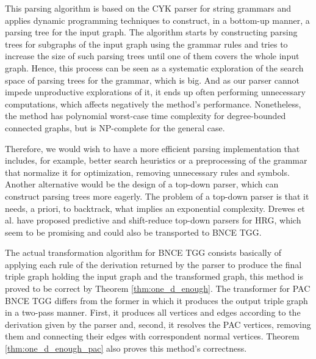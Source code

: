 This parsing algorithm is based on the CYK parser for string grammars and applies dynamic programming techniques to construct, in a bottom-up manner, a parsing tree for the input graph. The algorithm starts by constructing parsing trees for subgraphs of the input graph using the grammar rules and tries to increase the size of such parsing trees until one of them covers the whole input graph. Hence, this process can be seen as a systematic exploration of the search space of parsing trees for the grammar, which is big. And as our parser cannot impede unproductive explorations of it, it ends up often performing unnecessary computations, which affects negatively the method's performance. Nonetheless, the method has polynomial worst-case time complexity for degree-bounded connected graphs, but is NP-complete for the general case.

Therefore, we would wish to have a more efficient parsing implementation that includes, for example, better search heuristics or a preprocessing of the grammar that normalize it for optimization, removing unnecessary rules and symbols. Another alternative would be the design of a top-down parser, which can construct parsing trees more eagerly. The problem of a top-down parser is that it needs, a priori, to backtrack, what implies an exponential complexity. Drewes et al. \cite{drewes2015predictive,drewes2017predictive} have proposed predictive and shift-reduce top-down parsers for HRG, which seem to be promising and could also be transported to BNCE TGG.
 
The actual transformation algorithm for BNCE TGG consists basically of applying each rule of the derivation returned by the parser to produce the final triple graph holding the input graph and the transformed graph, this method is proved to be correct by Theorem \ref{thm:one_d_enough}. The transformer for PAC BNCE TGG differs from the former in which it produces the output triple graph in a two-pass manner. First, it produces all vertices and edges according to the derivation given by the parser and, second, it resolves the PAC vertices, removing them and connecting their edges with correspondent normal vertices. Theorem \ref{thm:one_d_enough_pac} also proves this method's correctness.


